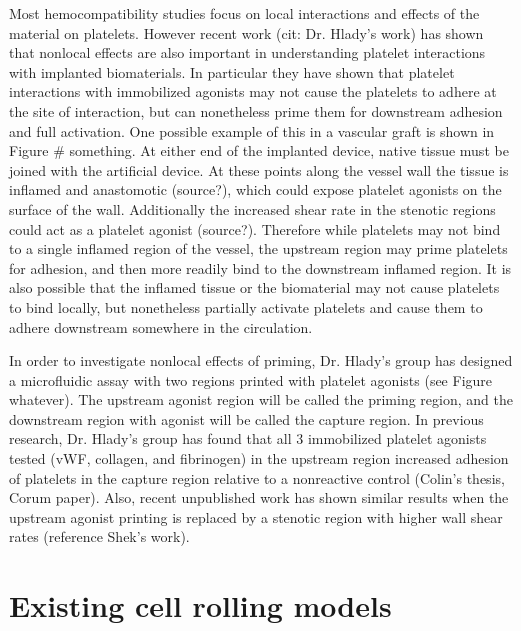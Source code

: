 
Most hemocompatibility studies focus on local interactions and effects
of the material on platelets. However recent work (cit: Dr. Hlady's
work) has shown that nonlocal effects are also important in
understanding platelet interactions with implanted biomaterials. In
particular they have shown that platelet interactions with immobilized
agonists may not cause the platelets to adhere at the site of
interaction, but can nonetheless prime them for downstream adhesion
and full activation. One possible example of this in a vascular graft
is shown in Figure \# something. At either end of the implanted
device, native tissue must be joined with the artificial device. At
these points along the vessel wall the tissue is inflamed and
anastomotic (source?), which could expose platelet agonists on the
surface of the wall. Additionally the increased shear rate in the
stenotic regions could act as a platelet agonist (source?). Therefore
while platelets may not bind to a single inflamed region of the
vessel, the upstream region may prime platelets for adhesion, and then
more readily bind to the downstream inflamed region. It is also
possible that the inflamed tissue or the biomaterial may not cause
platelets to bind locally, but nonetheless partially activate
platelets and cause them to adhere downstream somewhere in the
circulation.
		
In order to investigate nonlocal effects of priming, Dr. Hlady's group
has designed a microfluidic assay with two regions printed with
platelet agonists (see Figure whatever). The upstream agonist region
will be called the priming region, and the downstream region with
agonist will be called the capture region. In previous research,
Dr. Hlady's group has found that all 3 immobilized platelet agonists
tested (vWF, collagen, and fibrinogen) in the upstream region
increased adhesion of platelets in the capture region relative to a
nonreactive control (Colin's thesis, Corum paper). Also, recent
unpublished work has shown similar results when the upstream agonist
printing is replaced by a stenotic region with higher wall shear rates
(reference Shek's work).

\section{Existing cell rolling models}
\label{sec:exist-cell-roll}

